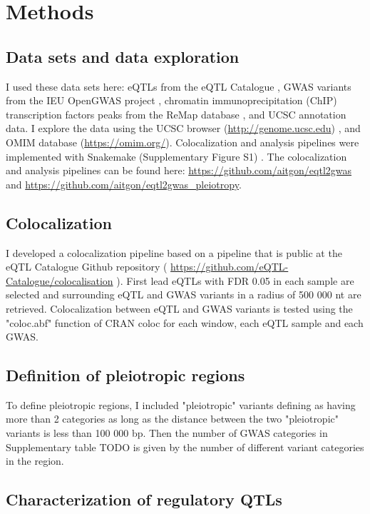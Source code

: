 \section*{Methods}\label{sec:methods}

\subsection*{Data sets and data exploration}

I used these data sets here: eQTLs from the eQTL Catalogue \citep{2021.Alasoo.Kerimov}, GWAS variants from the IEU OpenGWAS project \citep{2021.Marcora.Lyon}, chromatin immunoprecipitation (ChIP) transcription factors peaks from the ReMap database \citep{2021.Ballester.Hammal}, and UCSC annotation data.
%
I explore the data using the UCSC browser (\url{http://genome.ucsc.edu}) \citep{2021.Kent.Lee}, and OMIM database (\url{https://omim.org/}).
%
Colocalization and analysis pipelines were implemented with Snakemake (Supplementary Figure S1) .
%
The colocalization and analysis pipelines can be found here: \url{https://github.com/aitgon/eqtl2gwas} and \url{https://github.com/aitgon/eqtl2gwas_pleiotropy}.

\subsection*{Colocalization}

I developed a colocalization pipeline based on a pipeline that is public at the eQTL Catalogue Github repository ( \url{https://github.com/eQTL-Catalogue/colocalisation} ).
%
First lead eQTLs with FDR 0.05 in each sample are selected and surrounding eQTL and GWAS variants in a radius of 500 000 nt are retrieved.
%
Colocalization between eQTL and GWAS variants is tested using the "coloc.abf" function of CRAN coloc for each window, each eQTL sample and each GWAS.

\subsection*{Definition of pleiotropic regions}

To define pleiotropic regions, I included "pleiotropic" variants defining as having more than 2 categories as long as the distance between the two "pleiotropic" variants is less than 100 000 bp.
%
Then the number of GWAS categories in Supplementary table TODO is given by the number of different variant categories in the region.

\subsection*{Characterization of regulatory QTLs}

